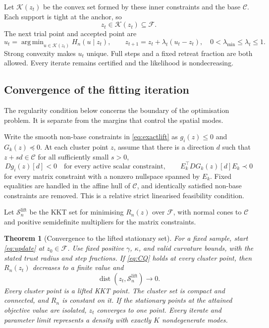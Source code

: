 \documentclass[12pt,a4paper]{article}
\newtheorem{theorem}{Theorem}[section]
\theoremstyle{remark}
\DeclareMathOperator{\dist}{dist}
\DeclareMathOperator{\argmin}{arg\,min}
\begin{document}
Let $\mathcal K(z_t)$ be the convex set formed by these inner constraints and the base $\mathcal C$. Each support is tight at the anchor, so
\[
 z_t\in\mathcal K(z_t)\subseteq\mathcal F.
\]
The next trial point and accepted point are
\begin{equation}\label{eq:update}
 u_t=\argmin_{u\in\mathcal K(z_t)}H_n(u\mid z_t),\qquad
 z_{t+1}=z_t+\lambda_t(u_t-z_t),
 \quad 0<\lambda_{\min}\le\lambda_t\le1.
\end{equation}
Strong convexity makes $u_t$ unique. Full steps and a fixed retreat fraction are both allowed. Every iterate remains certified and the likelihood is nondecreasing.

\subsection{Convergence of the fitting iteration}

The regularity condition below concerns the boundary of the optimisation problem. It is separate from the margins that control the spatial modes.

Write the smooth non-base constraints in \eqref{eq:exactlift} as $g_i(z)\le0$ and $G_k(z)\preceq0$. At each cluster point $z$, assume that there is a direction $d$ such that $z+sd\in\mathcal C$ for all sufficiently small $s>0$,
\begin{equation}\label{eq:CQ}
 Dg_i(z)[d]<0\quad\text{for every active scalar constraint},\qquad
 E_k^\top DG_k(z)[d]E_k\prec0
\end{equation}
for every matrix constraint with a nonzero nullspace spanned by $E_k$. Fixed equalities are handled in the affine hull of $\mathcal C$, and identically satisfied non-base constraints are removed. This is a relative strict linearised feasibility condition.

Let $\mathcal S_n^{\mathrm{lift}}$ be the KKT set for minimising $R_n(z)$ over $\mathcal F$, with normal cones to $\mathcal C$ and positive semidefinite multipliers for the matrix constraints.

\begin{theorem}[Convergence to the lifted stationary set]\label{thm:MM}
For a fixed sample, start \eqref{eq:update} at $z_0\in\mathcal F$. Use fixed positive $\gamma$, $\kappa$, and valid curvature bounds, with the stated trust radius and step fractions. If \eqref{eq:CQ} holds at every cluster point, then $R_n(z_t)$ decreases to a finite value and
\[
 \dist(z_t,\mathcal S_n^{\mathrm{lift}})\longrightarrow0.
\]
Every cluster point is a lifted KKT point. The cluster set is compact and connected, and $R_n$ is constant on it. If the stationary points at the attained objective value are isolated, $z_t$ converges to one point. Every iterate and parameter limit represents a density with exactly $K$ nondegenerate modes.
\end{theorem}
\end{document}
